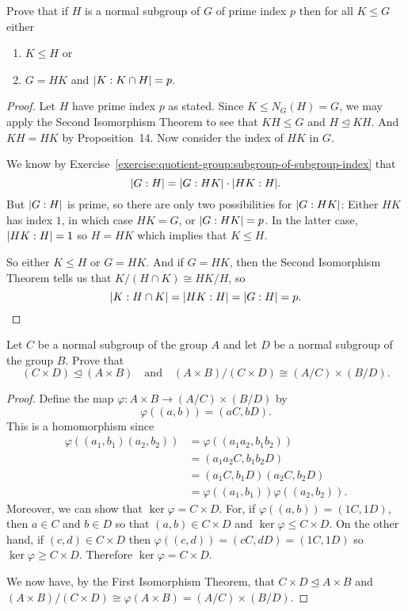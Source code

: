  Prove that if $H$ is a normal subgroup of $G$ of prime
index $p$ then for all $K\leq G$ either
\begin{enumerate}
\item $K\leq H$ or
\item $G = HK$ and $\lvert{K:K\cap H}\rvert = p$.
\end{enumerate}
\begin{proof}
  Let $H$ have prime index $p$ as stated. Since $K\leq N_G(H) = G$, we
  may apply the Second Isomorphism Theorem to see that $KH\leq G$ and
  $H\trianglelefteq KH$. And $KH = HK$ by Proposition~14. Now consider
  the index of $HK$ in $G$.

  We know by
  Exercise~\ref{exercise:quotient-group:subgroup-of-subgroup-index}
  that
  \begin{equation*}
    \lvert{G:H}\rvert = \lvert{G:HK}\rvert\cdot\lvert{HK:H}\rvert.
  \end{equation*}
  But $\lvert{G:H}\rvert$ is prime, so there are only two possibilities for
  $\lvert{G:HK}\rvert$: Either $HK$ has index $1$, in which case $HK = G$, or
  $\lvert{G:HK}\rvert = p$. In the latter case, $\lvert{HK:H}\rvert = 1$ so $H = HK$
  which implies that $K\leq H$.

  So either $K\leq H$ or $G = HK$. And if $G = HK$, then the Second
  Isomorphism Theorem tells us that $K/(H\cap K)\cong HK/H$, so
  \begin{equation*}
    \lvert{K:H\cap K}\rvert = \lvert{HK:H}\rvert = \lvert{G:H}\rvert = p. \qedhere
  \end{equation*}
\end{proof}

 Let $C$ be a normal subgroup of the group $A$ and let $D$
be a normal subgroup of the group $B$. Prove that
\begin{equation*}
  (C\times D)\trianglelefteq(A\times B)
  \quad\text{and}\quad
  (A\times B)/(C\times D)\cong(A/C)\times(B/D).
\end{equation*}
\begin{proof}
  Define the map $\varphi\colon A\times B\to(A/C)\times(B/D)$ by
  \begin{equation*}
    \varphi((a,b)) = (aC,bD).
  \end{equation*}
  This is a homomorphism since
  \begin{align*}
    \varphi((a_1,b_1)(a_2,b_2))
    &= \varphi((a_1a_2,b_1b_2)) \\
    &= (a_1a_2C, b_1b_2D) \\
    &= (a_1C,b_1D)(a_2C,b_2D) \\
    &= \varphi((a_1,b_1))\varphi((a_2,b_2)).
  \end{align*}
  Moreover, we can show that $\ker\varphi = C\times D$. For, if
  $\varphi((a,b)) = (1C,1D)$, then $a\in C$ and $b\in D$ so that
  $(a,b)\in C\times D$ and $\ker\varphi\leq C\times D$. On the other
  hand, if $(c,d)\in C\times D$ then
  $\varphi((c,d)) = (cC, dD) = (1C,1D)$ so
  $\ker\varphi\geq C\times D$. Therefore $\ker\varphi = C\times D$.

  We now have, by the First Isomorphism Theorem, that
  $C\times D\trianglelefteq A\times B$ and
  $(A\times B)/(C\times D)\cong \varphi(A\times B) =
  (A/C)\times(B/D)$.
\end{proof}

